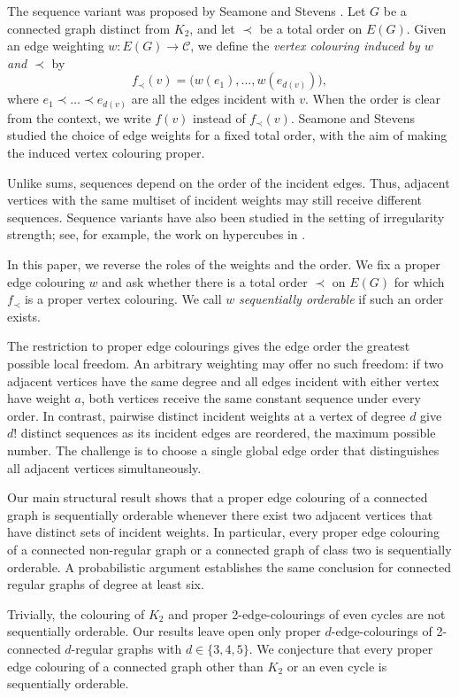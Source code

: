 \documentclass[a4paper,12pt]{elsarticle}
\begin{document}
The sequence variant was proposed by Seamone and Stevens \cite{SeamoneStevens}. Let $G$ be a connected graph distinct from $K_2$, and let $\prec$ be a total order on $E(G)$. Given an edge weighting $w: E(G) \rightarrow \mathcal C$, we define the \emph{vertex colouring induced by $w$ and $\prec$} by
\[
    f_{\prec}(v)=\bigl(w(e_1),\dots,w(e_{d(v)})\bigr),
\]
where $e_1\prec\dots\prec e_{d(v)}$ are all the edges incident with $v$. When the order is clear from the context, we write $f(v)$ instead of $f_{\prec}(v)$. Seamone and Stevens studied the choice of edge weights for a fixed total order, with the aim of making the induced vertex colouring proper.

Unlike sums, sequences depend on the order of the incident edges. Thus, adjacent vertices with the same multiset of incident weights may still receive different sequences. Sequence variants have also been studied in the setting of irregularity strength; see, for example, the work on hypercubes in \cite{Hypercubes}.

In this paper, we reverse the roles of the weights and the order. We fix a proper edge colouring $w$ and ask whether there is a total order $\prec$ on $E(G)$ for which $f_{\prec}$ is a proper vertex colouring. We call $w$ \emph{sequentially orderable} if such an order exists.

The restriction to proper edge colourings gives the edge order the greatest possible local freedom. An arbitrary weighting may offer no such freedom: if two adjacent vertices have the same degree and all edges incident with either vertex have weight $a$, both vertices receive the same constant sequence under every order. In contrast, pairwise distinct incident weights at a vertex of degree $d$ give $d!$ distinct sequences as its incident edges are reordered, the maximum possible number. The challenge is to choose a single global edge order that distinguishes all adjacent vertices simultaneously.

Our main structural result shows that a proper edge colouring of a connected graph is sequentially orderable whenever there exist two adjacent vertices that have distinct sets of incident weights. In particular, every proper edge colouring of a connected non-regular graph or a connected graph of class two is sequentially orderable. A probabilistic argument establishes the same conclusion for connected regular graphs of degree at least six.

Trivially, the colouring of $K_2$ and proper 2-edge-colourings of even cycles are not sequentially orderable. Our results leave open only proper $d$-edge-colourings of 2-connected $d$-regular graphs with $d\in\{3,4,5\}$. We conjecture that every proper edge colouring of a connected graph other than $K_2$ or an even cycle is sequentially orderable.
\end{document}
